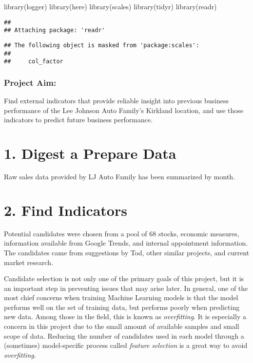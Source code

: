 \documentclass[
]{article}
\newenvironment{Shaded}{\begin{snugshade}}{\end{snugshade}}
\newcommand{\FunctionTok}[1]{\textcolor[rgb]{0.00,0.00,0.00}{#1}}
\newcommand{\NormalTok}[1]{#1}
\begin{document}
\begin{Shaded}
\begin{Highlighting}[]
\FunctionTok{library}\NormalTok{(logger)}
\FunctionTok{library}\NormalTok{(here)}
\FunctionTok{library}\NormalTok{(scales)}
\FunctionTok{library}\NormalTok{(tidyr)}
\FunctionTok{library}\NormalTok{(readr)}
\end{Highlighting}
\end{Shaded}

\begin{verbatim}
## 
## Attaching package: 'readr'
\end{verbatim}

\begin{verbatim}
## The following object is masked from 'package:scales':
## 
##     col_factor
\end{verbatim}

\hypertarget{project-aim}{%
\subsubsection{Project Aim:}\label{project-aim}}

Find external indicators that provide reliable insight into previous
business performance of the Lee Johnson Auto Family's Kirkland location,
and use those indicators to predict future business performance.

\hypertarget{digest-a-prepare-data}{%
\section{1. Digest a Prepare Data}\label{digest-a-prepare-data}}

Raw sales data provided by LJ Auto Family has been summarized by month.

\hypertarget{find-indicators}{%
\section{2. Find Indicators}\label{find-indicators}}

Potential candidates were chosen from a pool of 68 stocks, economic
measures, information available from Google Trends, and internal
appointment information. The candidates came from suggestions by Tod,
other similar projects, and current market research.

Candidate selection is not only one of the primary goals of this
project, but it is an important step in preventing issues that may arise
later. In general, one of the most chief concerns when training Machine
Learning models is that the model performs well on the set of training
data, but performs poorly when predicting new data. Among those in the
field, this is known as \emph{overfitting}. It is especially a concern
in this project due to the small amount of available samples and small
scope of data. Reducing the number of candidates used in each model
through a (sometimes) model-specific process called \emph{feature
selection} is a great way to avoid \emph{overfitting}.
\end{document}
